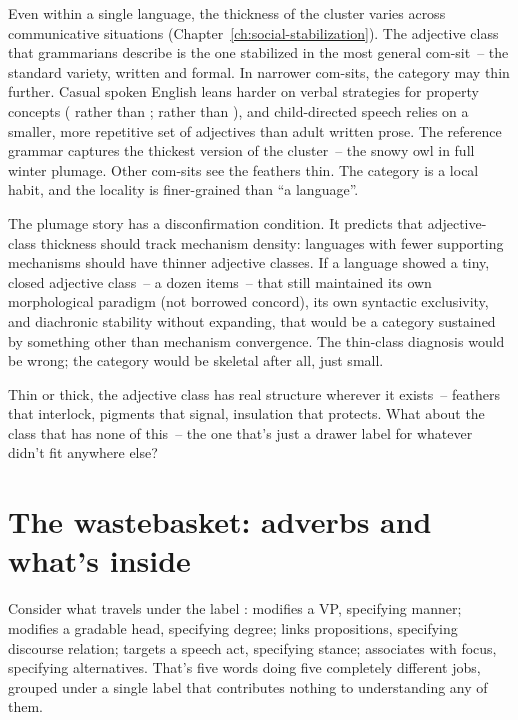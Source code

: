 Even within a single language, the thickness of the cluster varies across communicative situations (Chapter~\ref{ch:social-stabilization}). The adjective class that grammarians describe is the one stabilized in the most general com-sit~-- the standard variety, written and formal. In narrower com-sits, the category may thin further. Casual spoken English leans harder on verbal strategies for property concepts ( rather than ;  rather than ), and child-directed speech relies on a smaller, more repetitive set of adjectives than adult written prose. The reference grammar captures the thickest version of the cluster~-- the snowy owl in full winter plumage. Other com-sits see the feathers thin. The category is a local habit, and the locality is finer-grained than \enquote{a language}.

The plumage story has a disconfirmation condition. It predicts that adjective-class thickness should track mechanism density: languages with fewer supporting mechanisms should have thinner adjective classes. If a language showed a tiny, closed adjective class~-- a dozen items~-- that still maintained its own morphological paradigm (not borrowed concord), its own syntactic exclusivity, and diachronic stability without expanding, that would be a category sustained by something other than mechanism convergence. The thin-class diagnosis would be wrong; the category would be skeletal after all, just small.

Thin or thick, the adjective class has real structure wherever it exists~-- feathers that interlock, pigments that signal, insulation that protects. What about the class that has none of this~-- the one that's just a drawer label for whatever didn't fit anywhere else?


\section{The wastebasket: adverbs and what's inside}
\label{sec:11:wastebasket}

Consider what travels under the label :  modifies a VP, specifying manner;  modifies a gradable head, specifying degree;  links propositions, specifying discourse relation;  targets a speech act, specifying stance;  associates with focus, specifying alternatives. That's five words doing five completely different jobs, grouped under a single label that contributes nothing to understanding any of them.

